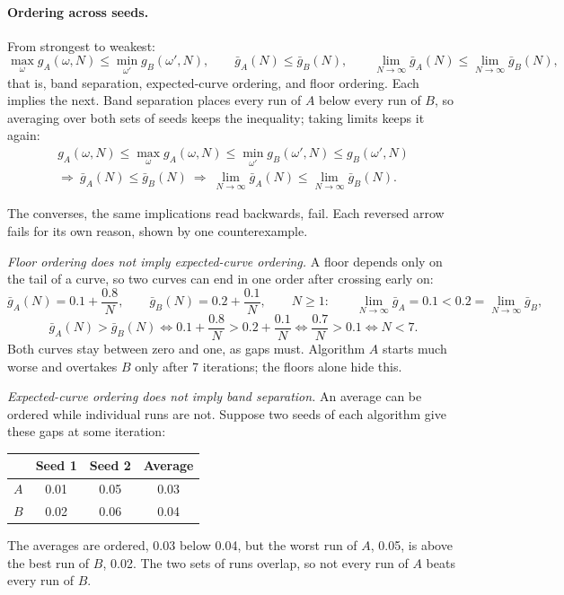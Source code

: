 \documentclass[11pt]{article}
\begin{document}
\paragraph{Ordering across seeds.} From strongest to weakest:
\[
  \max_{\omega} g_A(\omega, N) \le \min_{\omega'} g_B(\omega', N), \qquad
  \bar g_A(N) \le \bar g_B(N), \qquad
  \lim_{N \to \infty} \bar g_A(N) \le \lim_{N \to \infty} \bar g_B(N),
\]
that is, band separation, expected-curve ordering, and floor ordering. Each implies the next. Band
separation places every run of $A$ below every run of $B$, so averaging over both sets of seeds keeps
the inequality; taking limits keeps it again:
\begin{gather*}
  g_A(\omega, N) \le \max_{\omega} g_A(\omega, N) \le \min_{\omega'} g_B(\omega', N)
    \le g_B(\omega', N) \\
  \Longrightarrow\ \bar g_A(N) \le \bar g_B(N)
  \ \Longrightarrow\ \lim_{N \to \infty} \bar g_A(N) \le \lim_{N \to \infty} \bar g_B(N).
\end{gather*}

The converses, the same implications read backwards, fail. Each reversed arrow fails for its own
reason, shown by one counterexample.

\emph{Floor ordering does not imply expected-curve ordering.} A floor depends only on the tail of a
curve, so two curves can end in one order after crossing early on:
\[
  \bar g_A(N) = 0.1 + \frac{0.8}{N}, \qquad \bar g_B(N) = 0.2 + \frac{0.1}{N}, \qquad N \ge 1: \qquad
  \lim_{N \to \infty} \bar g_A = 0.1 < 0.2 = \lim_{N \to \infty} \bar g_B ,
\]
\[
  \bar g_A(N) > \bar g_B(N) \iff 0.1 + \frac{0.8}{N} > 0.2 + \frac{0.1}{N}
  \iff \frac{0.7}{N} > 0.1 \iff N < 7 .
\]
Both curves stay between zero and one, as gaps must. Algorithm $A$ starts much worse and overtakes
$B$ only after 7 iterations; the floors alone hide this.

\emph{Expected-curve ordering does not imply band separation.} An average can be ordered while
individual runs are not. Suppose two seeds of each algorithm give these gaps at some iteration:
\begin{center}
  \begin{tabular}{lccc}
    \toprule
      & Seed 1 & Seed 2 & Average \\
    \midrule
    $A$ & 0.01 & 0.05 & 0.03 \\
    $B$ & 0.02 & 0.06 & 0.04 \\
    \bottomrule
  \end{tabular}
\end{center}
The averages are ordered, 0.03 below 0.04, but the worst run of $A$, 0.05, is above the best run of
$B$, 0.02. The two sets of runs overlap, so not every run of $A$ beats every run of $B$.
\end{document}
